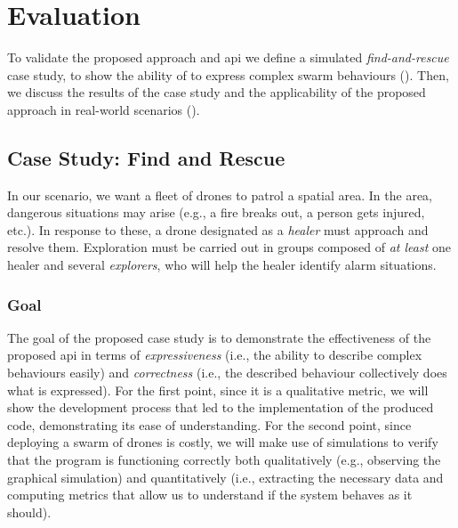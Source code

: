 \section{Evaluation}
\label{coordination2023-macro:sec:eval}

To validate the proposed approach and \ac{api} we define a simulated \emph{find-and-rescue} case study,
to show 
the ability of \MacroSwarm{} to express complex swarm behaviours (). 
Then, we discuss the results of the case study and the applicability of the proposed approach in real-world scenarios ().

\subsection{Case Study: Find and Rescue}\label{coordination2023-macro:subsec:case-study}
In our scenario, we want a fleet of drones to patrol a spatial area.
% 
In the area, dangerous situations may arise (e.g., a fire breaks out, a person gets injured, etc.). 
%
 In response to these, a drone designated as a \emph{healer} 
 must approach and resolve them. %
%
Exploration must be carried out in groups composed of \emph{at least} one 
 healer and several \emph{explorers}, who will help the healer identify alarm situations.

\subsubsection{Goal}
The goal of the proposed case study is to demonstrate the effectiveness of the proposed \ac{api} in terms of \emph{expressiveness} (i.e., the ability to describe complex behaviours easily) and \emph{correctness} (i.e., the described behaviour collectively does what is expressed). 
%
For the first point, since it is a qualitative metric, we will show the development process that led to the implementation of the produced code, demonstrating its ease of understanding. 
%
For the second point, 
 since deploying a swarm of drones is costly, 
 we will make use of simulations to verify that the program is functioning correctly both qualitatively 
 (e.g., observing the graphical simulation) 
 and quantitatively 
 (i.e., extracting the necessary data and computing metrics that allow us to understand if the system behaves as it should).
%
%

